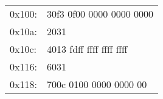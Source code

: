 \documentclass{article}
\begin{document}
\begin{tabular}{l l}
0x100: & 30f3 0f00 0000 0000 0000 \\
0x10a: & 2031 \\
0x10c: & 4013 fdff ffff ffff ffff \\
0x116: & 6031 \\
0x118: & 700c 0100 0000 0000 00
\end{tabular}
\end{document}
